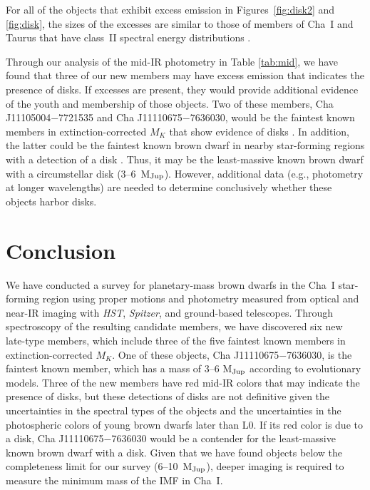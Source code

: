 \documentclass{emulateapj}
\begin{document}
For all of the objects that exhibit excess emission in Figures~\ref{fig:disk2}
and \ref{fig:disk}, the sizes of the excesses are similar to those
of members of Cha~I \citep{luh08,luhm08} and Taurus \citep{esp14} that have
class~II spectral energy distributions \citep[star+disk,][]{lw84,lad87}.

Through our analysis of the mid-IR photometry in Table \ref{tab:mid}, we have
found that three of our new members may have excess emission that indicates
the presence of disks. If excesses are present, they would provide additional
evidence of the youth and membership of those objects.
Two of these members, Cha J11105004$-$7721535 and Cha J11110675$-$7636030,
would be the faintest known members in extinction-corrected $M_K$ that show
evidence of disks \citep{luh08,luhM08}. In addition, the latter could be the
faintest known brown dwarf in nearby star-forming regions with a 
detection of a disk \citep{luhM12,esp14,luh16}. Thus, it may be the
least-massive known brown dwarf with a circumstellar disk (3--6~M$_{\rm Jup}$).
However, additional data (e.g., photometry at longer wavelengths) are needed 
to determine conclusively whether these objects harbor disks.

\section{Conclusion}

We have conducted a survey for planetary-mass brown dwarfs in the Cha~I
star-forming region using proper motions and photometry measured from optical
and near-IR imaging with {\it HST}, {\it Spitzer}, and ground-based telescopes. 
Through spectroscopy of the resulting candidate members,
we have discovered six new late-type members, which include three of the five
faintest known members in extinction-corrected $M_K$.
One of these objects, Cha J11110675$-$7636030, is the faintest known member, 
which has a mass of 3--6 M$_{\rm Jup}$ according to evolutionary models. 
Three of the new members have red mid-IR colors that may indicate the presence
of disks, but these detections of disks are not definitive given the
uncertainties in the spectral types of the objects and the uncertainties in
the photospheric colors of young brown dwarfs later than L0. If its red color
is due to a disk, Cha J11110675$-$7636030 would be a contender for the
least-massive known brown dwarf with a disk. Given that we have found objects
below the completeness limit for our survey (6--10~M$_{\rm Jup}$), deeper
imaging is required to measure the minimum mass of the IMF in Cha~I.
\end{document}
